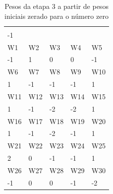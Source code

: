 \documentclass[11pt]{article}
\begin{document}
\begin{table}[h]
\centering
\caption{Pesos da etapa 3 a partir de pesos iniciais zerado para o número zero}
\label{tab:wp0z_3}
\begin{tabular}{lllll}
\cellcolor[HTML]{000000}{\color[HTML]{FFFFFF} W0} &                            &                            &                            &                            \\
-1                                                &                            &                            &                            &                            \\
\rowcolor[HTML]{000000}
{\color[HTML]{FFFFFF} W1}                         & {\color[HTML]{FFFFFF} W2}  & {\color[HTML]{FFFFFF} W3}  & {\color[HTML]{FFFFFF} W4}  & {\color[HTML]{FFFFFF} W5}  \\
-1                                                & 1                          & 0                          & 0                          & -1                         \\
\rowcolor[HTML]{000000}
{\color[HTML]{FFFFFF} W6}                         & {\color[HTML]{FFFFFF} W7}  & {\color[HTML]{FFFFFF} W8}  & {\color[HTML]{FFFFFF} W9}  & {\color[HTML]{FFFFFF} W10} \\
1                                                 & -1                         & -1                         & -1                         & 1                          \\
\rowcolor[HTML]{000000}
{\color[HTML]{FFFFFF} W11}                        & {\color[HTML]{FFFFFF} W12} & {\color[HTML]{FFFFFF} W13} & {\color[HTML]{FFFFFF} W14} & {\color[HTML]{FFFFFF} W15} \\
1                                                 & -1                         & -2                         & -2                         & 1                          \\
\rowcolor[HTML]{000000}
{\color[HTML]{FFFFFF} W16}                        & {\color[HTML]{FFFFFF} W17} & {\color[HTML]{FFFFFF} W18} & {\color[HTML]{FFFFFF} W19} & {\color[HTML]{FFFFFF} W20} \\
1                                                 & -1                         & -2                         & -1                         & 1                          \\
\rowcolor[HTML]{000000}
{\color[HTML]{FFFFFF} W21}                        & {\color[HTML]{FFFFFF} W22} & {\color[HTML]{FFFFFF} W23} & {\color[HTML]{FFFFFF} W24} & {\color[HTML]{FFFFFF} W25} \\
2                                                 & 0                          & -1                         & -1                         & 1                          \\
\rowcolor[HTML]{000000}
{\color[HTML]{FFFFFF} W26}                        & {\color[HTML]{FFFFFF} W27} & {\color[HTML]{FFFFFF} W28} & {\color[HTML]{FFFFFF} W29} & {\color[HTML]{FFFFFF} W30} \\
-1                                                & 0                          & 0                          & -1                         & -2
\end{tabular}
\end{table}
\end{document}
